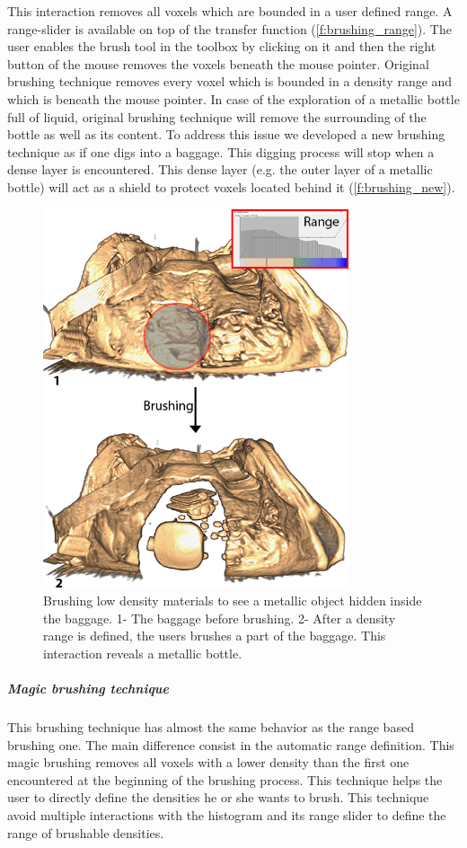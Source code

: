 This interaction removes all voxels which are bounded in a user defined range. A range-slider is available on top of the transfer function (\autoref{f:brushing_range}). The user enables the brush tool in the toolbox by clicking on it and then the right button of the mouse removes the voxels beneath the mouse pointer.
Original brushing technique removes every voxel which is bounded in a density range and which is beneath the mouse pointer. In case of the exploration of a metallic bottle full of liquid, original brushing technique will remove the surrounding of the bottle as well as its content. To address this issue we developed a new brushing technique as if one digs into a baggage. This digging process will stop when a dense layer is encountered. This dense layer (e.g. the outer layer of a metallic bottle) will act as a shield to protect voxels located behind it (\autoref{f:brushing_new}).

 \begin{figure}
\centering	\includegraphics[width=9cm]{Figures/brushing-range.png}
	\caption{ Brushing low density materials to see a metallic object hidden inside the baggage. 1- The baggage before brushing. 2- After a density range is defined, the users brushes a part of the baggage. This interaction reveals a metallic bottle.   }
	\label{f:brushing_range}
\end{figure}

\subparagraph{Magic brushing technique}
This brushing technique has almost the same behavior as the range based brushing one. The main difference consist in the automatic range definition. This magic brushing removes all voxels with a lower density than the first one encountered at the beginning of the brushing process. This technique helps the user to directly define the densities he or she wants to brush. This technique avoid multiple interactions with the histogram and its range slider to define the range of brushable densities.

